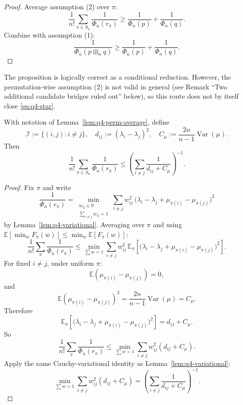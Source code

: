 \begin{proof}
Average assumption (2) over $\pi$:
\[
\frac1{n!}\sum_{\pi\in S_n}\frac1{\Phi_n(r_\pi)}
\ge
\frac1{\Phi_n(p)}+\frac1{\Phi_n(q)}.
\]
Combine with assumption (1):
\[
\frac1{\Phi_n(p\boxplus_n q)}
\ge
\frac1{\Phi_n(p)}+\frac1{\Phi_n(q)}.
\]
\end{proof}

\begin{remark}
The proposition is logically correct as a conditional reduction.
However, the permutation-wise assumption (2) is not valid in general
(see Remark ``Two additional candidate bridges ruled out'' below),
so this route does not by itself close \eqref{eq:q4-star}.
\end{remark}

\begin{lemma}\label{lem:q4-perm-avg-upper}
With notation of Lemma~\ref{lem:q4-perm-average}, define
\[
\mathcal I:=\{(i,j):i\neq j\},
\quad
d_{ij}:=(\lambda_i-\lambda_j)^2,
\quad
C_\mu:=\frac{2n}{n-1}\operatorname{Var}(\mu).
\]
Then
\[
\frac1{n!}\sum_{\pi\in S_n}\frac1{\Phi_n(r_\pi)}
\le
\left(\sum_{i\neq j}\frac1{d_{ij}+C_\mu}\right)^{-1}.
\]
\end{lemma}

\begin{proof}
Fix $\pi$ and write
\[
\frac1{\Phi_n(r_\pi)}
=
\min_{\substack{w_{ij}\in\mathbb R\\ \sum_{i\neq j}w_{ij}=1}}
\sum_{i\neq j} w_{ij}^2\,\bigl(\lambda_i-\lambda_j+\mu_{\pi(i)}-\mu_{\pi(j)}\bigr)^2
\]
by Lemma~\ref{lem:q4-variational}. Averaging over $\pi$ and using
$\mathbb E[\min_w F_\pi(w)]\le \min_w \mathbb E[F_\pi(w)]$:
\[
\frac1{n!}\sum_{\pi}\frac1{\Phi_n(r_\pi)}
\le
\min_{\sum w=1}\sum_{i\neq j} w_{ij}^2\,
\mathbb E_\pi\!\left[\bigl(\lambda_i-\lambda_j+\mu_{\pi(i)}-\mu_{\pi(j)}\bigr)^2\right].
\]
For fixed $i\neq j$, under uniform $\pi$:
\[
\mathbb E(\mu_{\pi(i)}-\mu_{\pi(j)})=0,
\]
and
\[
\mathbb E(\mu_{\pi(i)}-\mu_{\pi(j)})^2
=
\frac{2n}{n-1}\operatorname{Var}(\mu)
=
C_\mu.
\]
Therefore
\[
\mathbb E_\pi\!\left[\bigl(\lambda_i-\lambda_j+\mu_{\pi(i)}-\mu_{\pi(j)}\bigr)^2\right]
=
d_{ij}+C_\mu.
\]
So
\[
\frac1{n!}\sum_{\pi}\frac1{\Phi_n(r_\pi)}
\le
\min_{\sum w=1}\sum_{i\neq j} w_{ij}^2(d_{ij}+C_\mu).
\]
Apply the same Cauchy-variational identity as Lemma~\ref{lem:q4-variational}:
\[
\min_{\sum w=1}\sum_{i\neq j} w_{ij}^2(d_{ij}+C_\mu)
=
\left(\sum_{i\neq j}\frac1{d_{ij}+C_\mu}\right)^{-1}.
\]
\end{proof}


